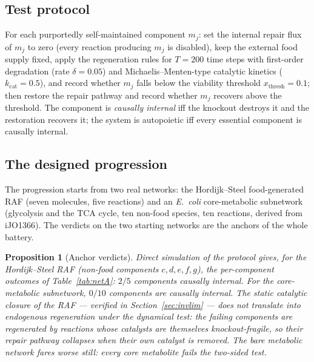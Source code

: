 \documentclass[11pt,a4paper]{article}
\theoremstyle{plain}
\newtheorem{proposition}[theorem]{Proposition}
\theoremstyle{definition}
\theoremstyle{remark}
\begin{document}
\subsection{Test protocol}

For each purportedly self-maintained component $m_j$: set the
internal repair flux of $m_j$ to zero (every reaction producing
$m_j$ is disabled), keep the external food supply fixed, apply the
regeneration rules for $T=200$ time steps with first-order
degradation (rate $\delta=0.05$) and Michaelis--Menten-type
catalytic kinetics ($k_{\mathrm{cat}}=0.5$), and record whether
$m_j$ falls below the viability threshold
$x_{\mathrm{thresh}}=0.1$; then restore the repair pathway and
record whether $m_j$ recovers above the threshold. The component
is \emph{causally internal} iff the knockout destroys it and the
restoration recovers it; the system is autopoietic iff every
essential component is causally internal.

\subsection{The designed progression}

The progression starts from two real networks: the
Hordijk--Steel food-generated RAF (seven molecules, five
reactions) and an \emph{E.~coli} core-metabolic subnetwork
(glycolysis and the TCA cycle, ten non-food species, ten
reactions, derived from iJO1366). The verdicts on the two
starting networks are the anchors of the whole battery.

\begin{proposition}[Anchor verdicts]\label{prop:net-anchors}
Direct simulation of the protocol gives, for the Hordijk--Steel
RAF (non-food components $c,d,e,f,g$), the per-component outcomes
of Table~\ref{tab:netA}: $2/5$ components causally internal. For
the core-metabolic subnetwork, $0/10$ components are causally
internal. The static catalytic closure of the RAF --- verified in
Section~\ref{sec:invlim} --- does not translate into endogenous
regeneration under the dynamical test: the failing components are
regenerated by reactions whose catalysts are themselves
knockout-fragile, so their repair pathway collapses when their own
catalyst is removed. The bare metabolic network fares worse still:
every core metabolite fails the two-sided test.
\end{proposition}
\end{document}
